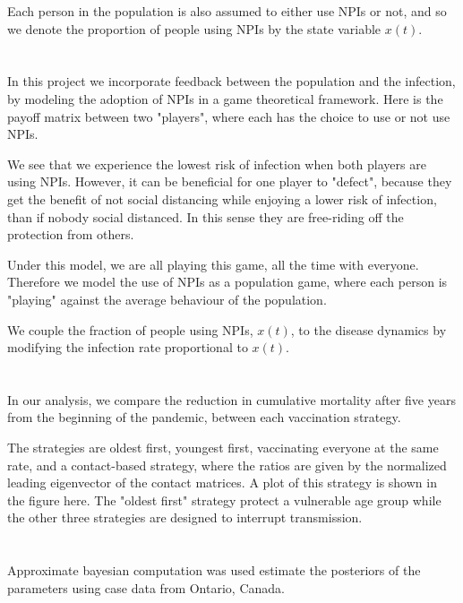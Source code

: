 \documentclass{article}
\begin{document}
Each person in the population is also assumed to either use NPIs or not, and so we denote the proportion of people using NPIs by the state variable $x(t)$.



\section{}
In this project we incorporate feedback between the population and the infection, by modeling the adoption of NPIs in a game theoretical framework. Here is the payoff matrix between two "players", where each has the choice to use or not use NPIs. 

We see that we experience the lowest risk of infection when both players are using NPIs. However, it can be beneficial for one player to "defect", because they get the benefit of not social distancing while enjoying a lower risk of infection, than if nobody social distanced. In this sense they are free-riding off the protection from others.

Under this model, we are all playing this game, all the time with everyone. Therefore we model the use of NPIs as a population game, where each person is "playing" against the average behaviour of the population.

We couple the fraction of people using NPIs, $x(t)$,  to the disease dynamics by modifying the infection rate proportional to $x(t)$.

\section{}

In our analysis, we compare the reduction in  cumulative mortality after five years from the beginning of the pandemic, between each vaccination strategy.

The strategies are oldest first, youngest first, vaccinating everyone at the same rate, and a contact-based strategy, where the ratios are given by the normalized leading eigenvector of the contact matrices. A plot of this strategy is shown in the figure here. The "oldest first" strategy protect a vulnerable age group while the other three strategies are designed to interrupt transmission.


\section{}
Approximate bayesian computation was used estimate the posteriors of the parameters using case data from Ontario, Canada.
\end{document}
